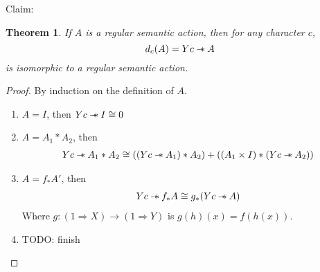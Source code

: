 \documentclass[12pt]{article}
\newtheorem{theorem}{Theorem}
\newcommand\rsepimp{\mathbin{-\mkern-6mu*}}
\newcommand\sepconj{\mathbin{*}}
\begin{document}
Claim:
\begin{theorem}
  If $A$ is a regular semantic action, then for any character $c$,
  \[ d_c(A) = Yc \rsepimp A \]
  is isomorphic to a regular semantic action.
\end{theorem}
\begin{proof}
  By induction on the definition of $A$.
  \begin{enumerate}
  \item $A = I$, then $Y c\rsepimp I \cong 0$
  \item $A = A_1 \sepconj A_2$, then
    \begin{align*}
      Yc \rsepimp A_1 \sepconj A_2
      \cong ((Yc \rsepimp A_1) \sepconj A_2) + ((A_1 \times I) \sepconj (Yc \rsepimp A_2))
    \end{align*}
  \item $A = f_*A'$, then
    \begin{align*}
      Y c \rsepimp f_*A \cong g_*(Yc \rsepimp A)
    \end{align*}
    Where $g : (1 \Rightarrow X) \to (1 \Rightarrow Y)$ is $g(h)(x) =
    f(h(x))$.
  \item TODO: finish
  \end{enumerate}
\end{proof}





\end{document}
